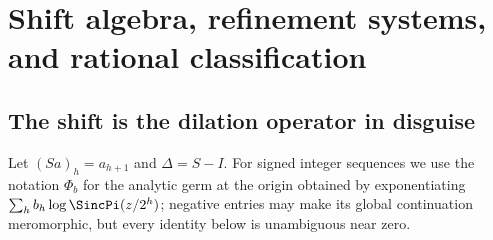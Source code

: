 \documentclass[11pt,oneside]{article}
\numberwithin{equation}{section}
\theoremstyle{definition}
\theoremstyle{remark}
\begin{document}
\section{Shift algebra, refinement systems, and rational classification}
\label{p1:sec:shift}

\subsection{The shift is the dilation operator in disguise}

Let $(Sa)_h=a_{h+1}$ and $\Delta=S-I$.  For signed integer sequences we use the notation
$\Phi_b$ for the analytic germ at the origin obtained by exponentiating
$\sum_hb_h\log\SincPi(z/2^h)$; negative entries may make its global continuation
meromorphic, but every identity below is unambiguous near zero.
\end{document}
